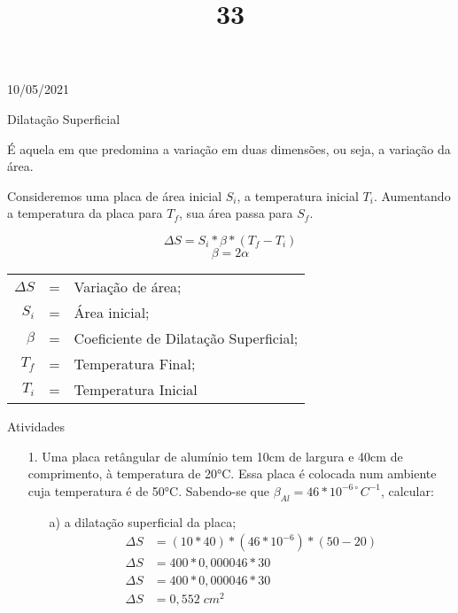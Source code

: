 \documentclass{SchoolBook}
\begin{document}
    \begin{day}{10/05/2021}
        \title{3}{Dilatação Superficial}
        
        É aquela em que predomina a variação em duas dimensões, ou seja, a variação da área.
        
        Consideremos uma placa de área inicial $S_i$, a temperatura inicial $T_i$. Aumentando a temperatura da placa para $T_f$, sua área passa para $S_f$.
        
        $$ \Delta S = S_i * \beta * (T_f - T_i) $$
        $$ \beta = 2\alpha $$
        
        \vspace{6pt}
        \begin{tabular}{ r c l }
            $ \Delta S $ &=& Variação de área;                     \\
                 $ S_i $ &=& Área inicial;                         \\
               $ \beta $ &=& Coeficiente de Dilatação Superficial; \\
                 $ T_f $ &=& Temperatura Final;                    \\
                 $ T_i $ &=& Temperatura Inicial
        \end{tabular}
        \vspace{6pt}
        
        \title{3}{Atividades}
        
        \begin{enumerate}
            \item[1.] Uma placa retângular de alumínio tem 10cm de largura e 40cm de comprimento, à temperatura de 20°C. Essa placa é colocada num ambiente cuja temperatura é de 50°C. Sabendo-se que $\beta_{Al} = 46 * 10^{-6\circ}C^{-1}$, calcular:
            
            \begin{enumerate}
                \item[a)] a dilatação superficial da placa;
                \begin{align*}
                    \Delta S &= (10 * 40) * (46 * 10^{-6}) * (50 - 20) \\
                    \Delta S &= 400 * 0,000046 * 30                    \\
                    \Delta S &= 400 * 0,000046 * 30                    \\
                    \Delta S &= 0,552\;cm^2
                \end{align*}
                

\end{enumerate}
\end{enumerate}
\end{day}
\end{document}
